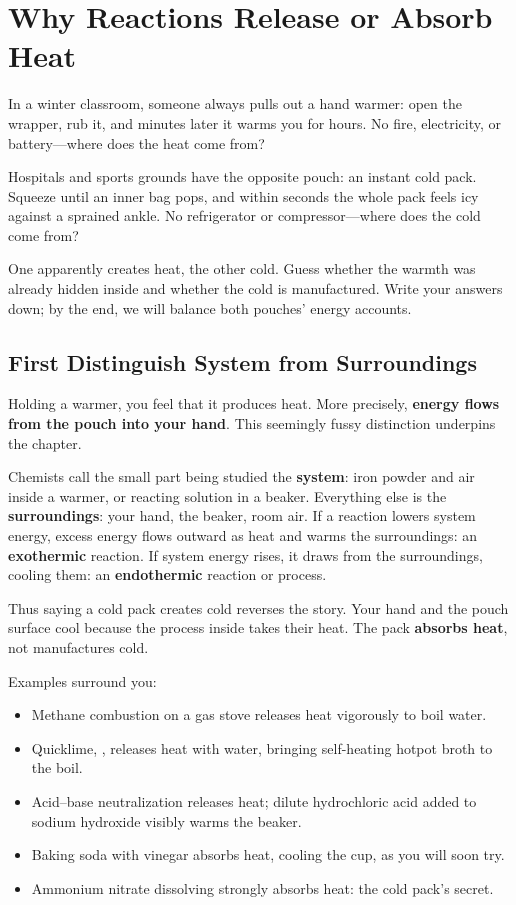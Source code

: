 \chapter{Why Reactions Release or Absorb Heat}

\begin{kaichang}
In a winter classroom, someone always pulls out a hand warmer: open the wrapper, rub it, and minutes later it warms you for hours. No fire, electricity, or battery---where does the heat come from?

Hospitals and sports grounds have the opposite pouch: an instant cold pack. Squeeze until an inner bag pops, and within seconds the whole pack feels icy against a sprained ankle. No refrigerator or compressor---where does the cold come from?

One apparently creates heat, the other cold. Guess whether the warmth was already hidden inside and whether the cold is manufactured. Write your answers down; by the end, we will balance both pouches' energy accounts.
\end{kaichang}

\section{First Distinguish System from Surroundings}

Holding a warmer, you feel that it produces heat. More precisely, \textbf{energy flows from the pouch into your hand}. This seemingly fussy distinction underpins the chapter.

Chemists call the small part being studied the \textbf{system}: iron powder and air inside a warmer, or reacting solution in a beaker. Everything else is the \textbf{surroundings}: your hand, the beaker, room air. If a reaction lowers system energy, excess energy flows outward as heat and warms the surroundings: an \textbf{exothermic} reaction. If system energy rises, it draws from the surroundings, cooling them: an \textbf{endothermic} reaction or process.

Thus saying a cold pack creates cold reverses the story. Your hand and the pouch surface cool because the process inside takes their heat. The pack \textbf{absorbs heat}, not manufactures cold.

Examples surround you:

\begin{itemize}[itemsep=2pt]
\item Methane combustion on a gas stove releases heat vigorously to boil water.
\item Quicklime, , releases heat with water, bringing self-heating hotpot broth to the boil.
\item Acid--base neutralization releases heat; dilute hydrochloric acid added to sodium hydroxide visibly warms the beaker.
\item Baking soda with vinegar absorbs heat, cooling the cup, as you will soon try.
\item Ammonium nitrate dissolving strongly absorbs heat: the cold pack's secret.
\end{itemize}

